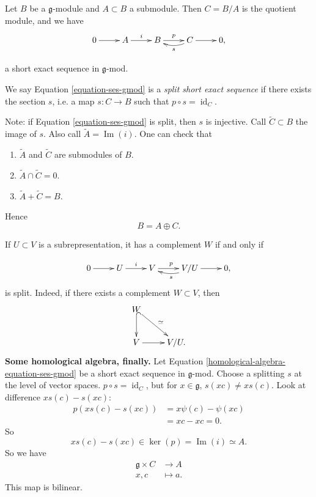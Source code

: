 \noindent
Let $B$ be a $\mathfrak{g}$-module and
$A \subset B$ a submodule.
Then $C = B/A$ is the quotient module, and
we have
\begin{equation}
\label{equation-ses-gmod}
\xymatrix{
0\ar[r]
&A\ar[r]^i
&B\ar[r]^p
&C\ar[r]\ar@/^.5pc/[l]^s
&0,
}
\end{equation}

\noindent
a short exact sequence in
$\mathfrak{g}$-mod.

\begin{definition}
\label{definition-split}
We say Equation \ref{equation-ses-gmod}
is a {\it split short exact sequence} 
if there exists the section $s$,
i.e. a map $s:C \to B$ such that $p \circ s
= \operatorname{id}_C$.
\end{definition}

\noindent
Note: if Equation \ref{equation-ses-gmod}
is split, then $s$ is injective.
Call $\widetilde{C} \subset B$
the image of $s$.
Also call $\tilde{A} =
\operatorname{Im}(i)$.
One can check that
\begin{enumerate}
\item $\widetilde{A}$ and
$\widetilde{C}$ are submodules of $B$.

\item $\tilde{A} \cap \widetilde{C}=0$.

\item $\widetilde{A}+\widetilde{C}=B$.
\end{enumerate}

\noindent
Hence
$$
B=A \oplus C.
$$

\medskip\noindent
If $U \subset V$ is a subrepresentation,
it has a complement $W$ if and only if

$$
\xymatrix{
0\ar[r]
&U\ar[r]^i
&V\ar[r]^p
&V/U\ar[r]\ar@/^.5pc/[l]^s
&0,
}
$$
is split. Indeed, if there exists
a complement $W \subset V$, then
$$
\xymatrix{
W \ar@{^{(}->}[d]\ar[dr]^{\simeq}\\
V \ar[r] & V/U.
}
$$
\medskip\noindent
{\bf Some homological algebra, finally.} 
Let Equation
\ref{homological-algebra-equation-ses-gmod}
be a short exact sequence in
$\mathfrak{g}$-mod. Choose a splitting $s$
at the level of vector spaces.
$p \circ s = \operatorname{id}_C$,
but for $x \in \mathfrak{g}$,
$s(xc) \neq  xs(c)$.
Look at difference $x s(c) - s(xc)$:
$$
\begin{aligned}
p(xs(c)-s(xc)) &= x \psi(c)-\psi(xc)\\
&=xc-xc = 0.
\end{aligned}
$$
So $$
xs(c) - s(xc) \in \ker(p)
= \operatorname{Im}(i) \simeq A.
$$
So we have
$$
\begin{aligned}
\mathfrak{g}\times C &\longrightarrow A \\
x,c &\longmapsto a.
\end{aligned}
$$
This map is bilinear.

